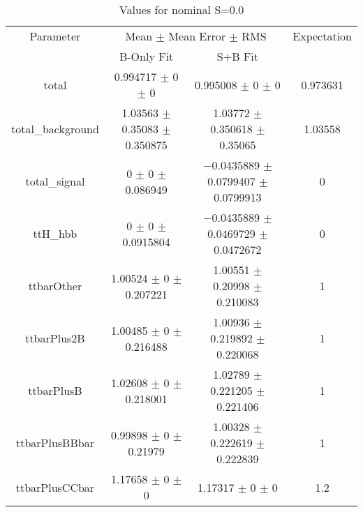 \begin{table}
\centering
\caption{Values for nominal S=0.0}
\begin{tabular}{cccc}
\toprule
Parameter & \multicolumn{2}{c}{Mean $\pm$ Mean Error $\pm$ RMS} & Expectation\\
 & B-Only Fit & S+B Fit & \\
\midrule
total & \num{0.994717} $\pm$ \num{0} $\pm$ \num{0} & \num{0.995008} $\pm$ \num{0} $\pm$ \num{0} & \num{0.973631}\\
total\_background & \num{1.03563} $\pm$ \num{0.35083} $\pm$ \num{0.350875} & \num{1.03772} $\pm$ \num{0.350618} $\pm$ \num{0.35065} & \num{1.03558}\\
total\_signal & \num{0} $\pm$ \num{0} $\pm$ \num{0.086949} & \num{-0.0435889} $\pm$ \num{0.0799407} $\pm$ \num{0.0799913} & \num{0}\\
ttH\_hbb & \num{0} $\pm$ \num{0} $\pm$ \num{0.0915804} & \num{-0.0435889} $\pm$ \num{0.0469729} $\pm$ \num{0.0472672} & \num{0}\\
ttbarOther & \num{1.00524} $\pm$ \num{0} $\pm$ \num{0.207221} & \num{1.00551} $\pm$ \num{0.20998} $\pm$ \num{0.210083} & \num{1}\\
ttbarPlus2B & \num{1.00485} $\pm$ \num{0} $\pm$ \num{0.216488} & \num{1.00936} $\pm$ \num{0.219892} $\pm$ \num{0.220068} & \num{1}\\
ttbarPlusB & \num{1.02608} $\pm$ \num{0} $\pm$ \num{0.218001} & \num{1.02789} $\pm$ \num{0.221205} $\pm$ \num{0.221406} & \num{1}\\
ttbarPlusBBbar & \num{0.99898} $\pm$ \num{0} $\pm$ \num{0.21979} & \num{1.00328} $\pm$ \num{0.222619} $\pm$ \num{0.222839} & \num{1}\\
ttbarPlusCCbar & \num{1.17658} $\pm$ \num{0} $\pm$ \num{0} & \num{1.17317} $\pm$ \num{0} $\pm$ \num{0} & \num{1.2}\\
\bottomrule
\end{tabular}
\end{table}
